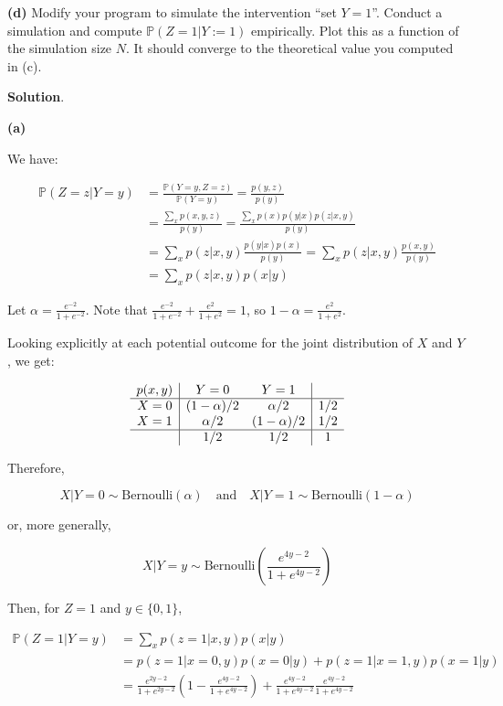 \textbf{(d)} Modify your program to simulate the intervention ``set
\(Y = 1\)''. Conduct a simulation and compute
\(\mathbb{P}(Z = 1 | Y := 1)\) empirically. Plot this as a function of
the simulation size \(N\). It should converge to the theoretical value
you computed in (c).

\textbf{Solution}.

\textbf{(a)}

We have:

\begin{align*}
\mathbb{P}(Z = z | Y = y) &= \frac{\mathbb{P}(Y = y, Z = z)}{\mathbb{P}(Y = y)} = \frac{p(y, z)}{p(y)} \\
&= \frac{\sum_x p(x, y, z)}{p(y)} = \frac{\sum_x p(x) p(y | x) p(z | x, y)}{p(y)} \\
&= \sum_x p(z | x, y) \frac{p(y | x) p(x)}{p(y)} = \sum_x p(z | x, y) \frac{p(x, y)}{p(y)} \\
&= \sum_x p(z | x, y) p(x | y)
\end{align*}

Let \(\alpha = \frac{e^{-2}}{1 + e^{-2}}\). Note that
\(\frac{e^{-2}}{1 + e^{-2}} + \frac{e^{2}}{1 + e^{2}} = 1\), so
\(1 - \alpha = \frac{e^{2}}{1 + e^{2}}\).

Looking explicitly at each potential outcome for the joint distribution
of \(X\) and \(Y\), we get:

\[
\begin{array}{c | cc | c}
p(x, y) & Y = 0 & Y = 1 & \\
\hline
X = 0 & (1 - \alpha) / 2 & \alpha / 2 & 1/2 \\
X = 1 & \alpha / 2 & (1 - \alpha) / 2 & 1/2 \\
\hline
  & 1/2 & 1/2 & 1
\end{array}
\]

Therefore,

\[ X | Y = 0 \sim \text{Bernoulli}\left( \alpha \right) 
\quad \text{and} \quad
X | Y = 1 \sim \text{Bernoulli}\left( 1 - \alpha \right) 
\]

or, more generally,

\[
X | Y = y \sim \text{Bernoulli}\left( \frac{e^{4y - 2}}{1 + e^{4y - 2}} \right) 
\]

Then, for \(Z = 1\) and \(y \in \{ 0, 1 \}\),

\begin{align*}
\mathbb{P}(Z = 1 | Y = y) &= \sum_x p(z = 1 | x, y) p(x | y) \\
&= p(z = 1 | x = 0, y) p(x = 0 | y) + p(z = 1 | x = 1, y) p(x = 1 | y) \\
&= \frac{e^{2y - 2}}{1 + e^{2y - 2}} \left( 1 - \frac{e^{4y - 2}}{1 + e^{4y - 2}} \right) + \frac{e^{4y - 2}}{1 + e^{4y - 2}} \frac{e^{4y - 2}}{1 + e^{4y - 2}}
\end{align*}

